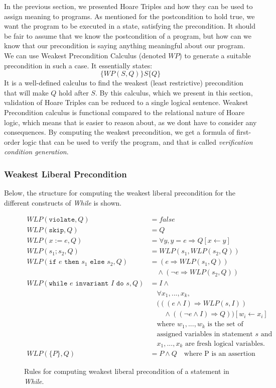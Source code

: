 In the previous section, we presented Hoare Triples and how they can be used to assign meaning to programs. As mentioned for the postcondition to hold true, we want the program to be executed in a state, satisfying the precondition. It should be fair to assume that we know the postcondition of a program, but how can we know that our precondition is saying anything meaningful about our program. We can use Weakest Precondition Calculus (denoted $WP$) to generate a suitable precondition in such a case.
It essentially states:
$$
\{WP(S,Q)\}S\{Q\}
$$
It is a well-defined calculus to find the weakest (least restrictive) precondition that will make $Q$ hold after $S$. By this calculus, which we present in this section, validation of Hoare Triples can be reduced to a single logical sentence. Weakest Precondition calculus is functional compared to the relational nature of Hoare logic, which means that is easier to reason about, as we dont have to consider any consequences.
By computing the weakest precondition, we get a formula of first-order logic that can be used to verify the program, and that is called \textit{verification condition generation}.

\subsubsection{Weakest Liberal Precondition}
Below, the structure for computing the weakest liberal precondition for the different constructs of \textit{While} is shown.

\begin{figure}
\begin{align*}
WLP(\texttt{violate}, Q) &= false \\
WLP(\texttt{skip}, Q) &= Q \\
WLP(x:=e,Q) &= \forall y, y = e \Rightarrow Q[x \leftarrow y] \\
WLP(s_1;s_2, Q) &= WLP(s_1, WLP(s_2, Q)) \\
WLP(\texttt{if } e \texttt{ then } s_1 \texttt{ else } s_2, Q) &= (e \Rightarrow WLP(s_1, Q)) \\
    &\quad \land (\neg e \Rightarrow WLP(s_2, Q)) \\
WLP(\texttt{while } e \texttt{ invariant } I \texttt{ do } s, Q) &= 
    I \land \\
&\quad \forall x_1, ..., x_k, \\
&\quad (((e \land I) \Rightarrow WLP(s, I)) \\
&\quad \quad \land (( \neg e \land I) \Rightarrow Q))
    [w_i \leftarrow x_i] \\
&\quad \text{where } w_1, ..., w_k \text{ is the set of} \\
&\quad \text{assigned variables in statement } s \text{ and } \\
&\quad x_1, ..., x_k \text{ are fresh logical variables.} \\
WLP(\{P\}, Q) &= P \land Q \quad \text{where P is an assertion}
\end{align*}
\caption{Rules for computing weakest liberal precondition of a statement in \textit{While}.}
\label{fig:wlp}
\end{figure}

